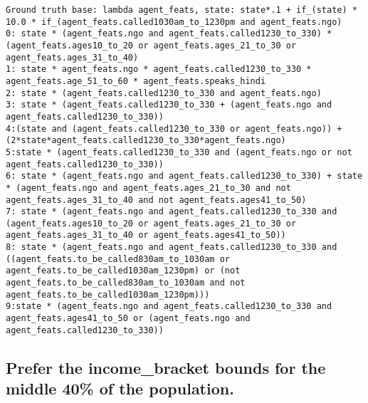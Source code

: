 \begin{lstlisting}
Ground truth base: lambda agent_feats, state: state*.1 + if_(state) * 10.0 * if_(agent_feats.called1030am_to_1230pm and agent_feats.ngo)
0: state * (agent_feats.ngo and agent_feats.called1230_to_330) * (agent_feats.ages10_to_20 or agent_feats.ages_21_to_30 or agent_feats.ages_31_to_40) 
1: state * agent_feats.ngo * agent_feats.called1230_to_330 * agent_feats.age_51_to_60 * agent_feats.speaks_hindi 
2: state * (agent_feats.called1230_to_330 and agent_feats.ngo) 
3: state * (agent_feats.called1230_to_330 + (agent_feats.ngo and agent_feats.called1230_to_330)) 
4:(state and (agent_feats.called1230_to_330 or agent_feats.ngo)) + (2*state*agent_feats.called1230_to_330*agent_feats.ngo)
5:state * (agent_feats.called1230_to_330 and (agent_feats.ngo or not agent_feats.called1230_to_330))
6: state * (agent_feats.ngo and agent_feats.called1230_to_330) + state * (agent_feats.ngo and agent_feats.ages_21_to_30 and not agent_feats.ages_31_to_40 and not agent_feats.ages41_to_50) 
7: state * (agent_feats.ngo and agent_feats.called1230_to_330 and (agent_feats.ages10_to_20 or agent_feats.ages_21_to_30 or agent_feats.ages_31_to_40 or agent_feats.ages41_to_50)) 
8: state * (agent_feats.ngo and agent_feats.called1230_to_330 and ((agent_feats.to_be_called830am_to_1030am or agent_feats.to_be_called1030am_1230pm) or (not agent_feats.to_be_called830am_to_1030am and not agent_feats.to_be_called1030am_1230pm))) 
9:state * (agent_feats.ngo and agent_feats.called1230_to_330 and agent_feats.ages41_to_50 or (agent_feats.ngo and agent_feats.called1230_to_330))

\end{lstlisting}
\subsection{Prefer the income\_bracket bounds for the middle 40\% of the population.}


